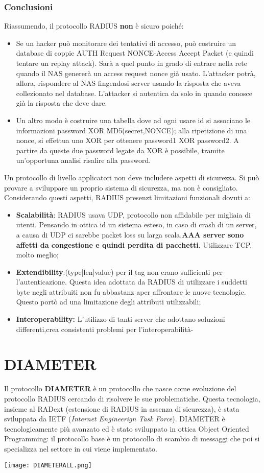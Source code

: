 \documentclass{article}
\theoremstyle{remark}
\begin{document}
\subsubsection{Conclusioni}
Riassumendo, il protocollo RADIUS \textbf{non} è sicuro poiché:\begin{itemize}
	\item Se un hacker può monitorare dei tentativi di accesso, può costruire un database di coppie AUTH Request NONCE-Access Accept Packet (e quindi tentare un replay attack). Sarà a quel punto in grado di entrare nella rete quando il NAS genererà un access request nonce già usato. L'attacker potrà, allora, rispondere al NAS fingendosi server usando la risposta che aveva collezionato nel database. L'attacker si autentica da solo in quando conosce già la risposta che deve dare.
	\item Un altro modo è costruire una tabella dove ad ogni usare id si associano le informazioni password XOR MD5(secret,NONCE); alla ripetizione di una nonce, si effettua uno XOR per ottenere password1 XOR password2. A partire da queste due password legate da XOR è possibile, tramite un'opportuna analisi risalire alla password.
\end{itemize}
Un protocollo di livello applicatori non deve includere aspetti di sicurezza. Si può provare a sviluppare un proprio sistema di sicurezza, ma non è consigliato.
Considerando questi aspetti, RADIUS presenzt limitazioni funzionali dovuti a:\begin{itemize}
	\item \textbf{Scalabilità}: RADIUS usava UDP, protocollo non affidabile per migliaia di utenti. Pensando in ottica id un sistema esteso, in caso di crash di un server, a causa di UDP ci sarebbe packet loss su larga scala.\textbf{AAA server sono affetti da congestione e quindi perdita di pacchetti}. Utilizzare TCP, molto meglio;
	\item \textbf{Extendibility}:(type|len|value) per il tag non erano sufficienti per l'autenticazione. Questa idea adottata da RADIUS di utilizzare i suddetti byte negli attribuiti non fu abbastanz aper affrontare le nuove tecnologie. Questo portò ad una limitazione degli attributi utilizzabili;
	\item \textbf{Interoperability:} L'utilizzo di tanti server che adottano soluzioni differenti,crea consistenti problemi per l'interoperabilità-
\end{itemize}
\section{DIAMETER}
Il protocollo \textbf{DIAMETER} è un protocollo che nasce come evoluzione del protocollo RADIUS cercando di risolvere le sue problematiche. Questa tecnologia, insieme al RADext (estensione di RADIUS in assenza di sicurezza), è stata sviluppata da IETF (\emph{Internet Engineerign Task Force}). DIAMETER è tecnologicamente più avanzato ed è stato sviluppato in ottica Object Oriented Programming: il protocollo base è un protocollo di scambio di messaggi che poi si specializza nel settore in cui viene implementato.\begin{center}
	\texttt{[image: DIAMETERALL.png]}
\end{center}
\end{document}
